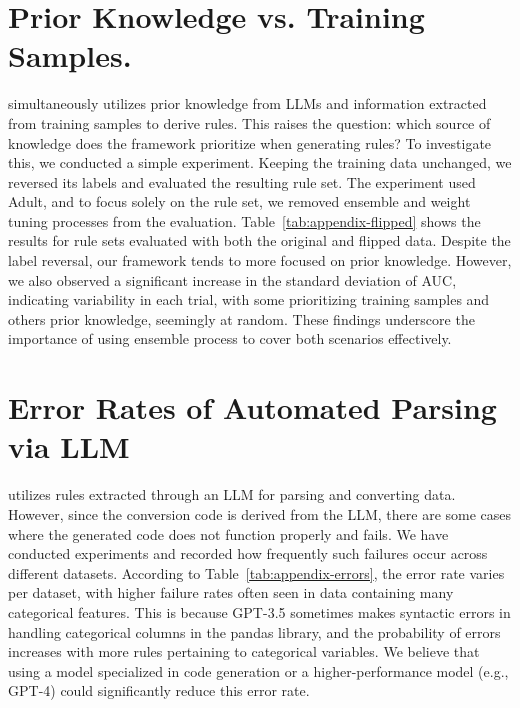 \documentclass{article}
\theoremstyle{plain}
\theoremstyle{definition}
\theoremstyle{remark}
\begin{document}
\section{Prior Knowledge vs. Training Samples.}
\model{} simultaneously utilizes prior knowledge from LLMs and information extracted from training samples to derive rules. This raises the question: which source of knowledge does the framework prioritize when generating rules? To investigate this, we conducted a simple experiment. Keeping the training data unchanged, we reversed its labels and evaluated the resulting rule set. The experiment used Adult, and to focus solely on the rule set, we removed ensemble and weight tuning processes from the evaluation. Table~\ref{tab:appendix-flipped} shows the results for rule sets evaluated with both the original and flipped data. Despite the label reversal, our framework tends to more focused on prior knowledge. However, we also observed a significant increase in the standard deviation of AUC, indicating variability in each trial, with some prioritizing training samples and others prior knowledge, seemingly at random. These findings underscore the importance of using ensemble process to cover both scenarios effectively.

\begin{table}[h!]
\centering
\caption{Comparison of AUC between original data and flipped data whose labels in training samples are reversely flipped. Adult dataset is utilized.}
\label{tab:appendix-flipped}
\end{table}


\newpage

\section{Error Rates of Automated Parsing via LLM}
\model{} utilizes rules extracted through an LLM for parsing and converting data. However, since the conversion code is derived from the LLM, there are some cases where the generated code does not function properly and fails. We have conducted experiments and recorded how frequently such failures occur across different datasets. According to Table~\ref{tab:appendix-errors}, the error rate varies per dataset, with higher failure rates often seen in data containing many categorical features. This is because GPT-3.5 sometimes makes syntactic errors in handling categorical columns in the pandas library, and the probability of errors increases with more rules pertaining to categorical variables. We believe that using a model specialized in code generation or a higher-performance model (e.g., GPT-4) could significantly reduce this error rate.
\end{document}
